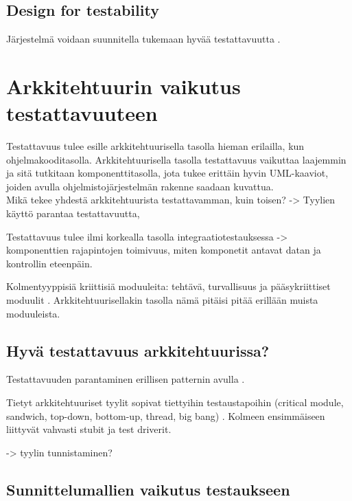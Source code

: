 \documentclass[finnish]{tktltiki2}
\theoremstyle{definition}
\theoremstyle{remark}
\begin{document}
\subsection{Design for testability}

Järjestelmä voidaan suunnitella tukemaan hyvää testattavuutta \citep[s. 20]{Voas:1995:STN:624607.625469}. 


\section{Arkkitehtuurin vaikutus testattavuuteen}

Testattavuus tulee esille arkkitehtuurisella tasolla hieman erilailla, kun ohjelmakooditasolla. Arkkitehtuurisella tasolla testattavuus vaikuttaa laajemmin ja sitä tutkitaan komponenttitasolla, jota tukee erittäin hyvin UML-kaaviot, joiden avulla ohjelmistojärjestelmän rakenne saadaan kuvattua. 
\\

Mikä tekee yhdestä arkkitehtuurista testattavamman, kuin toisen? -> Tyylien käyttö parantaa testattavuutta, \citep{Eickelmann:1996:MOS:243327.243602} 

Testattavuus tulee ilmi korkealla tasolla integraatiotestauksessa \citep{Eickelmann:1996:MOS:243327.243602} -> komponenttien rajapintojen toimivuus, miten komponetit antavat datan ja kontrollin eteenpäin.

Kolmentyyppisiä kriittisiä moduuleita: tehtävä, turvallisuus ja pääsykriittiset moduulit \citep{Eickelmann:1996:MOS:243327.243602}. Arkkitehtuurisellakin tasolla nämä pitäisi pitää erillään muista moduuleista.




\subsection{Hyvä testattavuus arkkitehtuurissa?}

Testattavuuden parantaminen erillisen patternin avulla \citep{coelho_improving_2005}. 

Tietyt arkkitehtuuriset tyylit sopivat tiettyihin testaustapoihin (critical module, sandwich, top-down, bottom-up, thread, big bang) \citep{Eickelmann:1996:MOS:243327.243602}. Kolmeen ensimmäiseen liittyvät vahvasti stubit ja test driverit. 

-> tyylin tunnistaminen?

\subsection{Sunnittelumallien vaikutus testaukseen}
\end{document}
